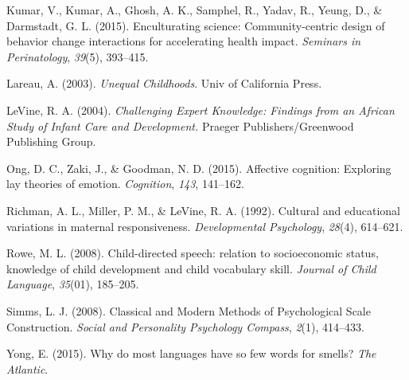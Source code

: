 \documentclass[10pt, letterpaper]{article}
\begin{document}
Kumar, V., Kumar, A., Ghosh, A. K., Samphel, R., Yadav, R., Yeung, D.,
\& Darmstadt, G. L. (2015). Enculturating science: Community-centric
design of behavior change interactions for accelerating health impact.
\emph{Seminars in Perinatology}, \emph{39}(5), 393--415.

Lareau, A. (2003). \emph{Unequal Childhoods}. Univ of California Press.

LeVine, R. A. (2004). \emph{Challenging Expert Knowledge: Findings from
an African Study of Infant Care and Development.} Praeger
Publishers/Greenwood Publishing Group.

Ong, D. C., Zaki, J., \& Goodman, N. D. (2015). Affective cognition:
Exploring lay theories of emotion. \emph{Cognition}, \emph{143},
141--162.

Richman, A. L., Miller, P. M., \& LeVine, R. A. (1992). Cultural and
educational variations in maternal responsiveness. \emph{Developmental
Psychology}, \emph{28}(4), 614--621.

Rowe, M. L. (2008). Child-directed speech: relation to socioeconomic
status, knowledge of child development and child vocabulary skill.
\emph{Journal of Child Language}, \emph{35}(01), 185--205.

Simms, L. J. (2008). Classical and Modern Methods of Psychological Scale
Construction. \emph{Social and Personality Psychology Compass},
\emph{2}(1), 414--433.

Yong, E. (2015). Why do most languages have so few words for smells?
\emph{The Atlantic}.
\end{document}
